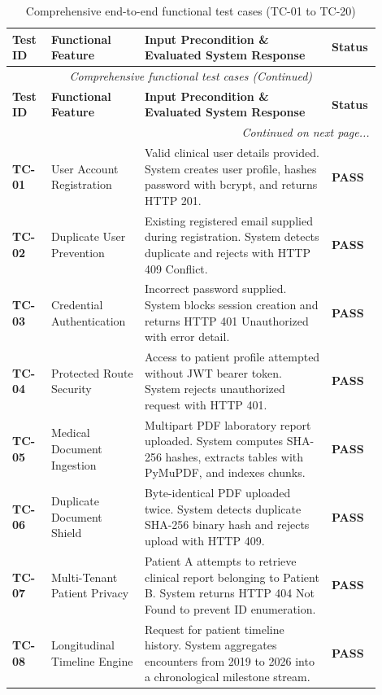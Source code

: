 \small
\begin{longtable}{@{}p{0.10\linewidth} p{0.24\linewidth} p{0.48\linewidth} p{0.08\linewidth}@{}}
\caption{Comprehensive end-to-end functional test cases (TC-01 to TC-20)}\label{tab:7_2_functional} \\
\toprule
\textbf{Test ID} & \textbf{Functional Feature} & \textbf{Input Precondition \& Evaluated System Response} & \textbf{Status} \\
\midrule
\endfirsthead
\toprule
\multicolumn{4}{c}{\small\textit{Comprehensive functional test cases (Continued)}} \\[4pt]
\midrule
\textbf{Test ID} & \textbf{Functional Feature} & \textbf{Input Precondition \& Evaluated System Response} & \textbf{Status} \\
\midrule
\endhead
\midrule
\multicolumn{4}{r}{\footnotesize\textit{Continued on next page...}} \\
\bottomrule
\endfoot
\bottomrule
\endlastfoot
\textbf{TC-01} & User Account Registration & Valid clinical user details provided. System creates user profile, hashes password with bcrypt, and returns HTTP 201. & \textbf{PASS} \\
\textbf{TC-02} & Duplicate User Prevention & Existing registered email supplied during registration. System detects duplicate and rejects with HTTP 409 Conflict. & \textbf{PASS} \\
\textbf{TC-03} & Credential Authentication & Incorrect password supplied. System blocks session creation and returns HTTP 401 Unauthorized with error detail. & \textbf{PASS} \\
\textbf{TC-04} & Protected Route Security & Access to patient profile attempted without JWT bearer token. System rejects unauthorized request with HTTP 401. & \textbf{PASS} \\
\textbf{TC-05} & Medical Document Ingestion & Multipart PDF laboratory report uploaded. System computes SHA-256 hashes, extracts tables with PyMuPDF, and indexes chunks. & \textbf{PASS} \\
\textbf{TC-06} & Duplicate Document Shield & Byte-identical PDF uploaded twice. System detects duplicate SHA-256 binary hash and rejects upload with HTTP 409. & \textbf{PASS} \\
\textbf{TC-07} & Multi-Tenant Patient Privacy & Patient A attempts to retrieve clinical report belonging to Patient B. System returns HTTP 404 Not Found to prevent ID enumeration. & \textbf{PASS} \\
\textbf{TC-08} & Longitudinal Timeline Engine & Request for patient timeline history. System aggregates encounters from 2019 to 2026 into a chronological milestone stream. & \textbf{PASS} \\

\end{longtable}
